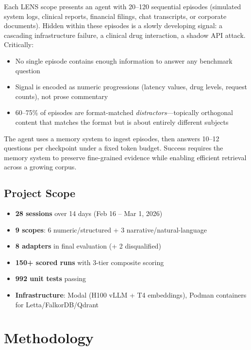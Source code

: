 \documentclass[11pt,letterpaper]{article}
\begin{document}
Each LENS scope presents an agent with 20--120 sequential episodes (simulated system logs, clinical reports, financial filings, chat transcripts, or corporate documents). Hidden within these episodes is a slowly developing signal: a cascading infrastructure failure, a clinical drug interaction, a shadow API attack. Critically:

\begin{itemize}[nosep]
  \item No single episode contains enough information to answer any benchmark question
  \item Signal is encoded as numeric progressions (latency values, drug levels, request counts), not prose commentary
  \item 60--75\% of episodes are format-matched \emph{distractors}---topically orthogonal content that matches the format but is about entirely different subjects
\end{itemize}

The agent uses a memory system to ingest episodes, then answers 10--12 questions per checkpoint under a fixed token budget. Success requires the memory system to preserve fine-grained evidence while enabling efficient retrieval across a growing corpus.

\subsection{Project Scope}

\begin{itemize}[nosep]
  \item \textbf{28 sessions} over 14 days (Feb 16 -- Mar 1, 2026)
  \item \textbf{9 scopes}: 6 numeric/structured + 3 narrative/natural-language
  \item \textbf{8 adapters} in final evaluation (+ 2 disqualified)
  \item \textbf{150+ scored runs} with 3-tier composite scoring
  \item \textbf{992 unit tests} passing
  \item \textbf{Infrastructure}: Modal (H100 vLLM + T4 embeddings), Podman containers for Letta/FalkorDB/Qdrant
\end{itemize}

\section{Methodology}
\end{document}
